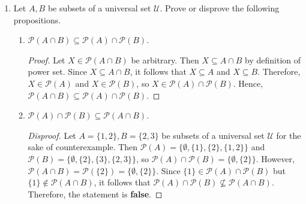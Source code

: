 \documentclass{article}
\theoremstyle{definition}
\begin{document}
\begin{enumerate}
\begin{enumerate}
  \item $(A \cup C) \times(B \cup D) \subseteq(A \times B) \cup(C \times D)$.
  \begin{proof}[Disproof]
    Let $A=\{1\}, B=\{2\}, C=\{3\}, D=\{4\}$ be subsets of a universal set $\mathcal{U}$ for the sake of counterexample. Then $(A \cup C) \times(B \cup D)=\{1,3\} \times \{2,4\}=\{(1,2),(1,4),(3,2),(3,4)\}$ and $(A \times B) \cup(C \times D)=\{(1,2)\} \cup \{(3,4)\}=\{(1,2),(3,4)\}$. Since $(1,4) \in (A \cup C) \times(B \cup D)$ but $(1,4) \notin (A \times B) \cup(C \times D)$, it follows that $(A \cup C) \times(B \cup D) \not\subseteq (A \times B) \cup(C \times D)$. Therefore, the statement is \textbf{false}.
  \end{proof}
  \end{enumerate}





  \newpage
  \item Let $A, B$ be subsets of a universal set $\mathcal{U}$. 
  Prove or disprove the following propositions.
  \begin{enumerate}
  \item $\mathcal{P}(A \cap B) \subseteq \mathcal{P}(A) \cap \mathcal{P}(B)$.
  \begin{proof}
    Let $X \in \mathcal{P}(A \cap B)$ be arbitrary. 
    Then $X \subseteq A \cap B$ by definition of power set. 
    Since $X \subseteq A \cap B$, it follows that 
    $X \subseteq A$ and $X \subseteq B$. Therefore, $X \in \mathcal{P}(A)$ 
    and $X \in \mathcal{P}(B)$, so $X \in \mathcal{P}(A) \cap \mathcal{P}(B)$. 
    Hence, $\mathcal{P}(A \cap B) \subseteq \mathcal{P}(A) \cap \mathcal{P}(B)$.
  \end{proof}
  \item $\mathcal{P}(A) \cap \mathcal{P}(B) \subseteq \mathcal{P}(A \cap B)$.
  \begin{proof}[Disproof]
    Let $A=\{1,2\}, B=\{2,3\}$ be subsets of a universal set $\mathcal{U}$ 
    for the sake of counterexample. Then 
    $\mathcal{P}(A)=\{\emptyset,\{1\},\{2\},\{1,2\}\}$ 
    and $\mathcal{P}(B)=\{\emptyset,\{2\},\{3\},\{2,3\}\}$, 
    so $\mathcal{P}(A) \cap \mathcal{P}(B)=\{\emptyset,\{2\}\}$. 
    However, $\mathcal{P}(A \cap B)=\mathcal{P}(\{2\})=\{\emptyset,\{2\}\}$. 
    Since $\{1\} \in \mathcal{P}(A) \cap \mathcal{P}(B)$ 
    but $\{1\} \notin \mathcal{P}(A \cap B)$, 
    it follows that $\mathcal{P}(A) \cap \mathcal{P}(B) \not\subseteq \mathcal{P}(A \cap B)$. 
    Therefore, the statement is \textbf{false}.
  \end{proof}


\end{enumerate}
\end{enumerate}
\end{document}
